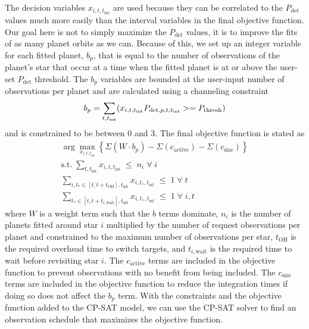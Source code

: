 The decision variables $x_{i, t, t_{\textrm{int}}}$ are used because they can
be correlated to the $P_\textrm{det}$ values much more easily than the interval
variables in the final objective function. Our goal here is not to simply
maximize the $P_\textrm{det}$ values, it is to improve the fits of as many
planet orbits as we can. Because of this, we set up an integer variable for each
fitted planet, $b_p$, that is equal to the number of observations
of the planet's star that occur at a time when the fitted planet is at or above
the user-set $P_\textrm{det}$ threshold. The $b_p$ variables are
bounded at the user-input number of observations per planet and are calculated
using a channeling constraint
\begin{equation}
  b_p = \sum_{t, t_\textrm{int}}(x_{i, t, t_\textrm{int}}P_{\textrm{det}, p, t, t_\textrm{int}} >= P_\textrm{thresh})\\
  \label{eq:bplanet}
\end{equation}
and is constrained to be between 0 and 3. The final objective function is stated as 
\begin{gather}
  \arg\max_{x_{i,t,t_\textrm{int}}}{\left\{ \Sigma\left(W \cdot
  b_p\right) - \Sigma\left( c_\textrm{active}\right) - \Sigma\left(
  c_\textrm{size}\right) \right\}}\\
  \textrm{s.t.} \; \sum_{t,t_\textrm{int}} x_{i,t,t_\textrm{int}} \; \leq \; n_i \; \forall \; i\\
  \sum_{i, t_*\in[t,t+t_\textrm{OH}], t_\textrm{int}} x_{i,t_*,t_\textrm{int}} \; \leq \; 1 \; \forall \; t\\
  \sum_{t_*\in[t,t+t_{i,\textrm{wait}}], t_\textrm{int}} x_{i,t_*,t_\textrm{int}} \; \leq \; 1 \; \forall \; i, t
 \label{eq:final_obj_function}
\end{gather}
where $W$ is a weight term such that the $b$ terms dominate, $n_i$ is the
number of planets fitted around star $i$ multiplied by the number of request
observations per planet and constrained to the maximum number of observations
per star, $t_\textrm{OH}$ is the required overhead time to switch targets, and
$t_{i,\textrm{wait}}$ is the required time to wait before revisiting star $i$.
The $c_\textrm{active}$ terms are included in the objective function to prevent
observations with no benefit from being included. The $c_\textrm{size}$ terms
are included in the objective function to reduce the integration times if doing
so does not affect the $b_p$ term. With the constraints and the
objective function added to the CP-SAT model, we can use the CP-SAT solver to
find an observation schedule that maximizes the objective function.

